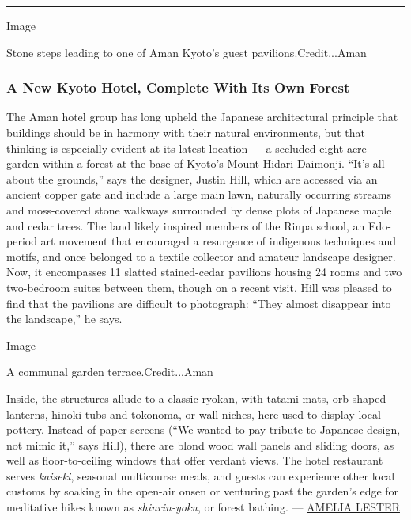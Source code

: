 \begin{center}\rule{0.5\linewidth}{\linethickness}\end{center}

Image

Stone steps leading to one of Aman Kyoto's guest pavilions.Credit...Aman

\hypertarget{a-new-kyoto-hotel-complete-with-its-own-forest}{%
\subsubsection{A New Kyoto Hotel, Complete With Its Own
Forest}\label{a-new-kyoto-hotel-complete-with-its-own-forest}}

The Aman hotel group has long upheld the Japanese architectural
principle that buildings should be in harmony with their natural
environments, but that thinking is especially evident at
\href{https://www.aman.com/resorts/aman-kyoto}{its latest location} ---
a secluded eight-acre garden-within-a-forest at the base of
\href{https://www.nytimes3xbfgragh.onion/2014/03/02/travel/36-hours-in-kyoto-japan.html}{Kyoto}'s
Mount Hidari Daimonji. ``It's all about the grounds,'' says the
designer, Justin Hill, which are accessed via an ancient copper gate and
include a large main lawn, naturally occurring streams and moss-covered
stone walkways surrounded by dense plots of Japanese maple and cedar
trees. The land likely inspired members of the Rinpa school, an
Edo-period art movement that encouraged a resurgence of indigenous
techniques and motifs, and once belonged to a textile collector and
amateur landscape designer. Now, it encompasses 11 slatted stained-cedar
pavilions housing 24 rooms and two two-bedroom suites between them,
though on a recent visit, Hill was pleased to find that the pavilions
are difficult to photograph: ``They almost disappear into the
landscape,'' he says.

Image

A communal garden terrace.Credit...Aman

Inside, the structures allude to a classic ryokan, with tatami mats,
orb-shaped lanterns, hinoki tubs and tokonoma, or wall niches, here used
to display local pottery. Instead of paper screens (``We wanted to pay
tribute to Japanese design, not mimic it,'' says Hill), there are blond
wood wall panels and sliding doors, as well as floor-to-ceiling windows
that offer verdant views. The hotel restaurant serves \emph{kaiseki},
seasonal multicourse meals, and guests can experience other local
customs by soaking in the open-air onsen or venturing past the garden's
edge for meditative hikes known as \emph{shinrin-yoku}, or forest
bathing. ---
\href{https://www.nytimes3xbfgragh.onion/by/amelia-lester}{AMELIA
LESTER}


